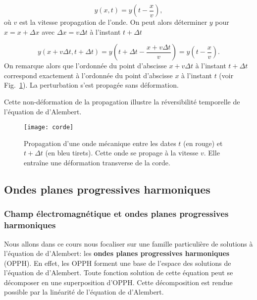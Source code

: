 \begin{equation*}
	y(x, t) = y\left(t - \frac{x}{v}\right),
\end{equation*}
où $v$ est la vitesse propagation de l'onde. On peut alors déterminer $y$ pour
$x = x + \Delta x$ avec $\Delta x = v \Delta t$ à l'instant $t + \Delta t$

\begin{equation*}
	y\left(x + v \Delta t, t + \Delta t\right) = y\left(t + \Delta t - 
	\frac{x + v \Delta t}{v}\right) = y\left(t - \dfrac{x}{v}\right).
\end{equation*}
On remarque alors que l'ordonnée du point d'abscisse $x + v \Delta t$ à l'instant
$t + \Delta t$ correspond exactement à l'ordonnée du point d'abscisse $x$
à l'instant $t$ (voir Fig.~\ref{fig:maxwell_corde}). La perturbation s'est propagée
sans déformation.

\begin{rem}
	Cette non-déformation de la propagation illustre la réversibilité temporelle
	de l'équation de d'Alembert.
\end{rem}

\begin{figure}[htpb]
	\centering
	\texttt{[image: corde]}
	\caption{Propagation d'une onde mécanique entre les dates $t$ (en rouge) et $t
	+ \Delta t$ (en bleu tirets). Cette onde se propage à la vitesse $v$. Elle
	entraîne une déformation transverse de la corde.}%
	\label{fig:maxwell_corde}
\end{figure}

\subsection{Ondes planes progressives harmoniques}
\subsubsection{Champ électromagnétique et ondes planes progressives harmoniques}
Nous allons dans ce cours nous focaliser sur une famille particulière de solutions
à l'équation de d'Alembert: les \textbf{ondes planes progressives harmoniques}
(OPPH). En effet, les OPPH forment une base de l'espace des solutions de l'équation
de d'Alembert. Toute fonction solution de cette équation peut se décomposer en une
superposition d'OPPH. Cette décomposition est rendue possible
par la linéarité de l'équation de d'Alembert.

